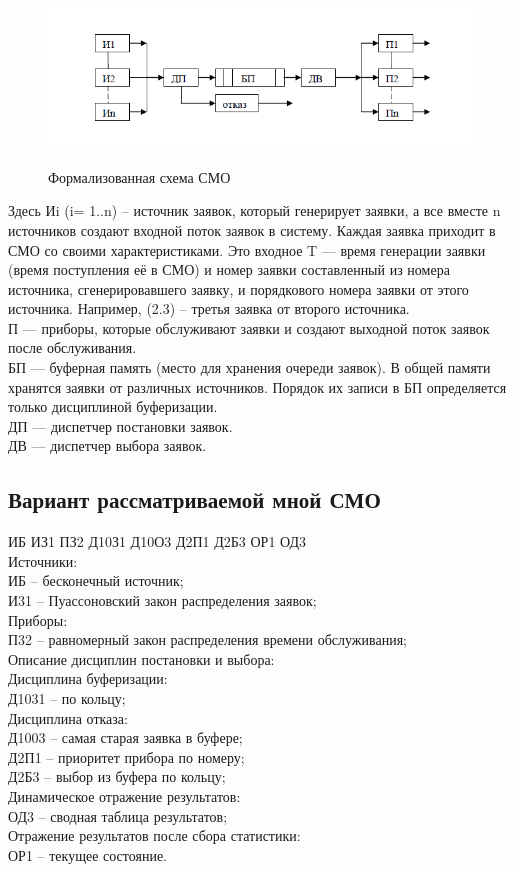 \documentclass{article}
\begin{document}
	\begin{figure}[!htbp]
	\centering
	\includegraphics[width=\textwidth,height=\textheight,keepaspectratio]{smo.png}\\
	\caption{Формализованная схема СМО}	
	\end{figure}
	Здесь Иi (i= 1..n) – источник заявок, который генерирует заявки, а
	все вместе n источников создают входной поток заявок в систему.
	Каждая заявка приходит в СМО со своими характеристиками.
	Это входное T — время генерации заявки (время поступления её в СМО) и номер заявки составленный из номера источника, сгенерировавшего заявку, и порядкового номера заявки от этого источника. Например, (2.3) – третья заявка от второго источника.\\
	П — приборы, которые обслуживают заявки и создают выходной
	поток заявок после обслуживания.\\
	БП — буферная память (место для хранения очереди заявок).
	В общей памяти хранятся заявки от различных источников.
	Порядок их записи в БП определяется только дисциплиной
	буферизации.\\
	ДП — диспетчер постановки заявок.\\
	ДВ — диспетчер выбора заявок.\\
	\subsection{Вариант рассматриваемой мной СМО}
	ИБ	ИЗ1	ПЗ2	Д10З1	Д10О3	Д2П1	Д2Б3	ОР1	ОД3\\
	Источники:\\
	ИБ – бесконечный источник;\\
	И31 – Пуассоновский закон распределения заявок;\\
	Приборы:\\
	П32 – равномерный закон распределения времени обслуживания;\\
	Описание дисциплин постановки и выбора:\\
	Дисциплина буферизации:\\	
	Д1031 – по кольцу;\\
	Дисциплина отказа:\\
	Д1003 – самая старая заявка в буфере; \\
	Д2П1 – приоритет прибора по номеру;\\
	Д2Б3 – выбор из буфера по кольцу;\\
	Динамическое отражение результатов:\\
	ОД3 – сводная таблица результатов;\\
	Отражение результатов после сбора статистики:\\
	ОР1 – текущее состояние.\\
	
\end{document}
